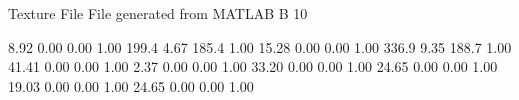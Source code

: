 Texture File
File generated from MATLAB
B 10

    8.92   0.00   0.00   1.00
   199.4   4.67   185.4  1.00
   15.28   0.00   0.00   1.00
   336.9   9.35   188.7  1.00
   41.41   0.00   0.00   1.00
    2.37   0.00   0.00   1.00
   33.20   0.00   0.00   1.00
   24.65   0.00   0.00   1.00
   19.03   0.00   0.00   1.00
   24.65   0.00   0.00   1.00